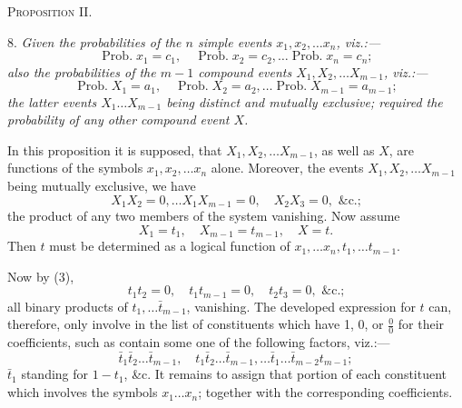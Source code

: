 \documentclass[oneside]{book}
\begin{document}
\begin{center}
\textsc{Proposition} II.
\end{center}

8. \emph{Given the probabilities of the $n$ simple events $x_1, x_2,\dotsc x_n$,
viz.:---}
\begin{equation}\tag{1}
\operatorname{Prob. } x_1 = c_1, \quad \operatorname{Prob. } x_2=c_2, \dotsc \operatorname{Prob. }x_n=c_n;
\end{equation}
\emph{also the probabilities of the $m-1$ compound events $X_1, X_2, \dotsc X_{m-1}$,
viz.:---}
\begin{equation}\tag{2}
\operatorname{Prob. } X_1=a_1, \quad \operatorname{Prob. } X_2 = a_2, \dotsc \operatorname{Prob. }X_{m-1}=a_{m-1};
\end{equation}
\emph{the latter events $X_1 \dotsc X_{m-1}$ being distinct and mutually exclusive;
required the probability of any other compound event $X$.}

In this proposition it is supposed, that $X_1, X_2,\dotsc X_{m-1}$, as
well as $X$, are functions of the symbols $x_1, x_2, \dotsc x_n$ alone.
Moreover, the events $X_1, X_2,\dotsc X_{m-1}$ being mutually exclusive,
we have
\begin{equation}\tag{3}
X_1 X_2 = 0, \dotsc X_1 X_{m-1}=0, \quad X_2 X_3 = 0, \text{ \&c.;}
\end{equation}
the product of any two members of the system vanishing. Now
assume
\begin{equation}\tag{4}
X_1=t_1, \quad X_{m-1}=t_{m-1}, \quad X=t.
\end{equation}
Then $t$ must be determined as a logical function of $x_1, \dotsc x_n,
t_1, \dotsc t_{m-1}$.

Now by (3),
\begin{equation}\tag{5}
t_1 t_2=0, \quad t_1 t_{m-1}=0, \quad t_2 t_3=0, \text{ \&c.;}
\end{equation}
all binary products of $t_1, \dotsc \bar{t}_{m-1}$, vanishing. The developed
expression for $t$ can, therefore, only involve in the list of constituents
which have 1, 0, or $\displaystyle \frac{0}{0}$ for their coefficients, such as contain
some one of the following factors, viz.:---
\begin{equation}\tag{6}
\bar{t}_1 \bar{t}_2 \dotsc \bar{t}_{m-1}, \quad t_1 \bar{t}_2 \dotsc \bar{t}_{m-1},\dotsc
\bar{t}_1 \dotsc \bar{t}_{m-2} t_{m-1};
\end{equation}
$\bar{t}_1$ standing for $1-t_1$, \&c. It remains to assign that portion of
each constituent which involves the symbols $x_1 \dotsc x_n$; together
with the corresponding coefficients.
\end{document}
